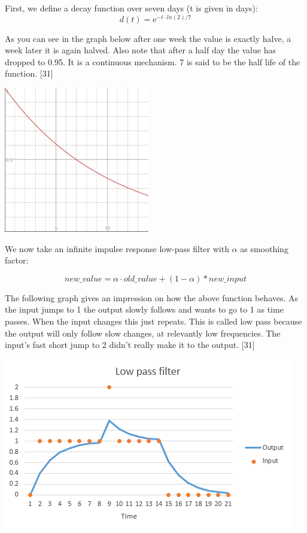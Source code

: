 First, we define a decay function over seven days (t is given in days):\\

\begin{equation}
d(t) =  \mathrm{e}^{-t \cdot  ln(2) / 7}  
\end{equation}

As you can see in the graph below after one week the value is exactly halve, a week later it is again halved. Also note that after a half day the value has dropped to 0.95. It is a continuous mechanism. 7 is said to be the half life of the function. [31]\\

\begin{center}
\includegraphics{figures/halflife}
\end{center}

We now take an infinite impulse response low-pass filter with $\alpha$ as smoothing factor:

\begin{equation}
new\_value = \alpha \cdot old\_value + (1-\alpha) * new\_input
\end{equation}

The following graph gives an impression on how the above function behaves. As the input jumps to 1 the output slowly follows and wants to go to 1 as time passes. When the input changes this just repeats. This is called low pass because the output will only follow slow changes, at relevantly low frequencies. The input’s fast short jump to 2 didn’t really make it to the output. [31]\\

\begin{center}
\includegraphics{figures/low-pass}
\end{center}

